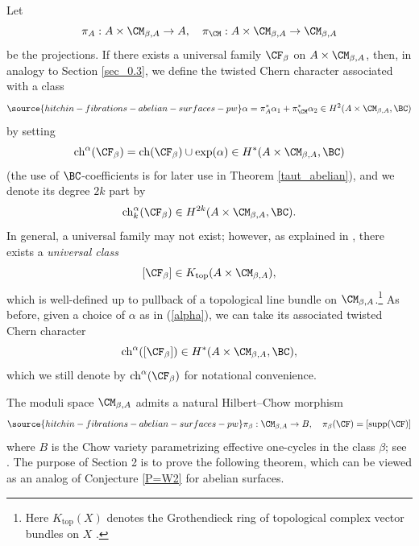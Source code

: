 Let
\[
\pi_A: A\times \CM_{\beta,A} \to A, \quad \pi_\CM: A\times \CM_{\beta,A} \to \CM_{\beta,A}
\]
be the projections.
If there exists a universal family $\CF_\beta$ on $A \times \CM_{\beta,A}$, then, in analogy to Section \ref{sec_0.3}, we define the twisted Chern character associated with a class
\begin{equation}\label{alpha}
\source{hitchin-fibrations-abelian-surfaces-pw}
\alpha = \pi_A^\ast \alpha_1 + \pi_\CM^\ast \alpha_2 \in H^2(A\times \CM_{\beta,A}, \BC)
\end{equation}
by setting
\[
\mathrm{ch}^\alpha(\CF_\beta) = \mathrm{ch}(\CF_\beta) \cup \mathrm{exp}(\alpha) \in H^{*}(A \times \CM_{\beta,A}, \BC)
\]
(the use of $\BC$-coefficients is for later use in Theorem \ref{taut_abelian}),
and we denote its degree  $2k$ part by
\[
\mathrm{ch}_k^\alpha(\CF_\beta) \in H^{2k}(A\times \CM_{\beta,A}, \BC).
\]
In general, a universal family may not exist; however, as explained in \cite[Section 3.1]{Markman5}, there exists
a \emph{universal class}
\[
[\CF_\beta] \in K_{\mathrm{top}}(A \times \CM_{\beta,A}),
\]
which is well-defined up to pullback of a topological line bundle on $\CM_{\beta,A}$.\footnote{Here $K_{\mathrm{top}}(X)$ denotes the Grothendieck ring of topological complex vector bundles on $X$ \cite{At}.}
As before, given a choice of $\alpha$ as in (\ref{alpha}), we can take its associated twisted Chern character
\[
\mathrm{ch}^{\alpha}([\CF_\beta]) \in H^{*}(A \times \CM_{\beta,A}, \BC),
\]
which we still denote by $\mathrm{ch}^{\alpha}(\CF_\beta)$ for notational convenience.



The moduli space $\CM_{\beta,A}$ admits a natural Hilbert--Chow morphism
\begin{equation}\label{Hilb-Ch}
\source{hitchin-fibrations-abelian-surfaces-pw}
\pi_\beta: \CM_{\beta,A} \to B, \quad \pi_\beta(\CF) = [\mathrm{supp}(\CF)]
\end{equation}
where $B$ is  the Chow variety parametrizing effective one-cycles in the class $\beta$; see \cite{LP1,LP2}. The purpose of Section 2 is to prove the following theorem, which can be viewed as an analog of Conjecture \ref{P=W2} for abelian surfaces.

